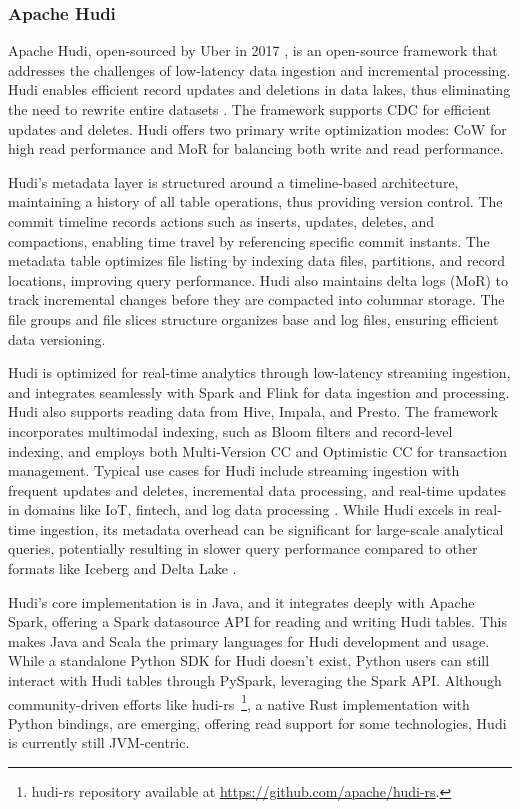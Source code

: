 \subsubsection*{Apache Hudi}
Apache Hudi, open-sourced by Uber in 2017 \cite{rajaperumalUberEngineeringIncremental2017}, is an open-source framework that addresses the challenges of low-latency data ingestion and incremental processing. Hudi enables efficient record updates and deletions in data lakes, thus eliminating the need to rewrite entire datasets \cite{hudi_tech_docs}. The framework supports \gls{CDC} for efficient updates and deletes. Hudi offers two primary write optimization modes: \gls{CoW} for high read performance and \gls{MoR} for balancing both write and read performance. 

Hudi's metadata layer is structured around a timeline-based architecture, maintaining a history of all table operations, thus providing version control. The commit timeline records actions such as inserts, updates, deletes, and compactions, enabling time travel by referencing specific commit instants. The metadata table optimizes file listing by indexing data files, partitions, and record locations, improving query performance. Hudi also maintains delta logs (\gls{MoR}) to track incremental changes before they are compacted into columnar storage. The file groups and file slices structure organizes base and log files, ensuring efficient data versioning. 

Hudi is optimized for real-time analytics through low-latency streaming ingestion, and integrates seamlessly with Spark and Flink for data ingestion and processing. Hudi also supports reading data from Hive, Impala, and Presto. The framework incorporates multimodal indexing, such as Bloom filters and record-level indexing, and employs both Multi-Version \gls{CC} and Optimistic \gls{CC} for transaction management. Typical use cases for Hudi include streaming ingestion with frequent updates and deletes, incremental data processing, and real-time updates in domains like IoT, fintech, and log data processing \cite{comparison1_LakeFS}. While Hudi excels in real-time ingestion, its metadata overhead can be significant for large-scale analytical queries, potentially resulting in slower query performance compared to other formats like Iceberg and Delta Lake \cite{comparison4_starburst}.

Hudi's core implementation is in Java, and it integrates deeply with Apache Spark, offering a Spark datasource \gls{API} for reading and writing Hudi tables.  This makes Java and Scala the primary languages for Hudi development and usage.  While a standalone Python \gls{SDK} for Hudi doesn't exist, Python users can still interact with Hudi tables through PySpark, leveraging the Spark \gls{API}.  Although community-driven efforts like hudi-rs~\footnote{hudi-rs repository available at \url{https://github.com/apache/hudi-rs}.}, a native Rust implementation with Python bindings, are emerging, offering read support for some technologies, Hudi is currently still \gls{JVM}-centric.



